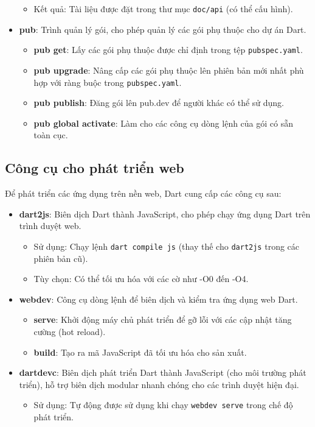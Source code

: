 \documentclass[../DoAn.tex]{subfiles}
\numberwithin{figure}{chapter}
\begin{document}
\begin{itemize}
\begin{itemize}
        \item Kết quả: Tài liệu được đặt trong thư mục \texttt{doc/api} (có thể cấu hình).
    \end{itemize}
    \item \textbf{pub}: Trình quản lý gói, cho phép quản lý các gói phụ thuộc cho dự án Dart.
    \begin{itemize}
        \item \textbf{pub get}: Lấy các gói phụ thuộc được chỉ định trong tệp \texttt{pubspec.yaml}.
        \item \textbf{pub upgrade}: Nâng cấp các gói phụ thuộc lên phiên bản mới nhất phù hợp với ràng buộc trong \texttt{pubspec.yaml}.
        \item \textbf{pub publish}: Đăng gói lên pub.dev để người khác có thể sử dụng.
        \item \textbf{pub global activate}: Làm cho các công cụ dòng lệnh của gói có sẵn toàn cục.
    \end{itemize}
\end{itemize}

\subsection{Công cụ cho phát triển web}

Để phát triển các ứng dụng trên nền web, Dart cung cấp các công cụ sau:

\begin{itemize}
    \item \textbf{dart2js}: Biên dịch Dart thành JavaScript, cho phép chạy ứng dụng Dart trên trình duyệt web.
    \begin{itemize}
        \item Sử dụng: Chạy lệnh \texttt{dart compile js} (thay thế cho \texttt{dart2js} trong các phiên bản cũ).
        \item Tùy chọn: Có thể tối ưu hóa với các cờ như -O0 đến -O4.
    \end{itemize}
    \item \textbf{webdev}: Công cụ dòng lệnh để biên dịch và kiểm tra ứng dụng web Dart.
    \begin{itemize}
        \item \textbf{serve}: Khởi động máy chủ phát triển để gỡ lỗi với các cập nhật tăng cường (hot reload).
        \item \textbf{build}: Tạo ra mã JavaScript đã tối ưu hóa cho sản xuất.
    \end{itemize}
    \item \textbf{dartdevc}: Biên dịch phát triển Dart thành JavaScript (cho môi trường phát triển), hỗ trợ biên dịch modular nhanh chóng cho các trình duyệt hiện đại.
    \begin{itemize}
        \item Sử dụng: Tự động được sử dụng khi chạy \texttt{webdev serve} trong chế độ phát triển.
    \end{itemize}
\end{itemize}
\end{document}
